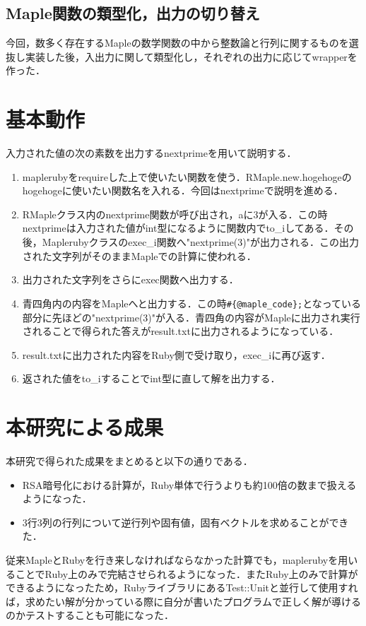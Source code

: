 \documentclass[10pt,a4j,twocolumn]{jsarticle}
\begin{document}
\subsection{Maple関数の類型化，出力の切り替え}
今回，数多く存在するMapleの数学関数の中から整数論と行列に関するものを選抜し実装した後，入出力に関して類型化し，それぞれの出力に応じてwrapperを作った．

\section{基本動作}
入力された値の次の素数を出力するnextprimeを用いて説明する．

\begin{enumerate}
\item maplerubyをrequireした上で使いたい関数を使う．RMaple.new.hogehogeのhogehogeに使いたい関数名を入れる．今回はnextprimeで説明を進める．
\item RMapleクラス内のnextprime関数が呼び出され，aに3が入る．この時nextprimeは入力された値がint型になるように関数内でto\_iしてある．その後，Maplerubyクラスのexec\_i関数へ"nextprime(3)"が出力される．この出力された文字列がそのままMapleでの計算に使われる．
\item 出力された文字列をさらにexec関数へ出力する．
\item 青四角内の内容をMapleへと出力する．この時\verb|#{@maple_code};|となっている部分に先ほどの"nextprime(3)"が入る．青四角の内容がMapleに出力され実行されることで得られた答えがresult.txtに出力されるようになっている．
\item result.txtに出力された内容をRuby側で受け取り，exec\_iに再び返す．
\item 返された値をto\_iすることでint型に直して解を出力する．
\end{enumerate}
\section{本研究による成果}
本研究で得られた成果をまとめると以下の通りである．

\begin{itemize}
\item RSA暗号化における計算が，Ruby単体で行うよりも約100倍の数まで扱えるようになった．
\item 3行3列の行列について逆行列や固有値，固有ベクトルを求めることができた．
\end{itemize}
従来MapleとRubyを行き来しなければならなかった計算でも，maplerubyを用いることでRuby上のみで完結させられるようになった．またRuby上のみで計算ができるようになったため，RubyライブラリにあるTest::Unitと並行して使用すれば，求めたい解が分かっている際に自分が書いたプログラムで正しく解が導けるのかテストすることも可能になった．
\end{document}
